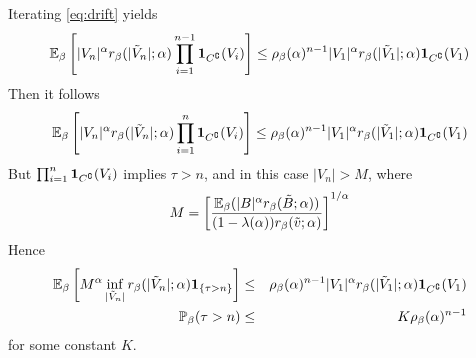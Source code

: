 \documentclass{article}
\begin{document}
\begin{remark}
  Iterating \eqref{eq:drift} yields
  \[
  \mathbb{E}_\beta \left[
    |V_n|^\alpha r_\beta(|\tilde V_n|; \alpha) \prod_{i=1}^{n-1}\mathbf{1}_{C^\complement}(V_i)\right]
  \leq \rho_\beta(\alpha)^{n-1} |V_1|^\alpha r_\beta(|\tilde V_1|; \alpha) \mathbf{1}_{C^\complement}(V_1)
  \]
  Then it follows
  \[
  \mathbb{E}_\beta \left[
    |V_n|^\alpha r_\beta(|\tilde V_n|; \alpha) \prod_{i=1}^{n}\mathbf{1}_{C^\complement}(V_i)\right]
  \leq \rho_\beta(\alpha)^{n-1} |V_1|^\alpha r_\beta(|\tilde V_1|; \alpha) \mathbf{1}_{C^\complement}(V_1)
  \]
  But $\prod_{i=1}^{n}\mathbf{1}_{C^\complement}(V_i)$ implies $\tau > n$, and in this
  case $|V_n| > M$, where
  \[
  M = \left[
    \mathbb{E}_\beta (|B|^\alpha r_\beta(\tilde B; \alpha)) 
    \over
    (1 - \lambda(\alpha)) r_\beta(\tilde v; \alpha)
  \right]^{1/\alpha}
  \]
  Hence
  \begin{eqnarray}
    \mathbb{E}_\beta \left[
      M^\alpha \inf_{|\tilde V_n|} r_\beta(|\tilde V_n|; \alpha) \mathbf{1}_{\{\tau > n\}}\right]
    &\leq& \rho_\beta(\alpha)^{n-1} |V_1|^\alpha r_\beta(|\tilde V_1|; \alpha) \mathbf{1}_{C^\complement}(V_1) \nonumber \\
    \mathbb{P}_\beta(\tau > n) &\leq& K \rho_\beta(\alpha)^{n-1} \label{eq:ret_time}
  \end{eqnarray}
  for some constant $K$.
\end{remark}
\end{document}
